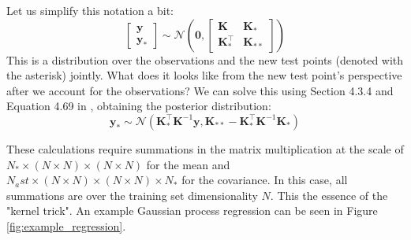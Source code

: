 \documentclass{article}
\begin{document}
Let us simplify this notation a bit:
\begin{equation}
    \begin{bmatrix}
    \mathbf{y} \\
    \mathbf{y_\ast}
    \end{bmatrix} \sim
    \mathcal{N}\left(\mathbf{0},
    \begin{bmatrix}
    \mathbf{K} & \mathbf{K}_\ast \\
    \mathbf{K}^\top_\ast & \mathbf{K}_{\ast\ast}
    \end{bmatrix}\right)
\end{equation} 
This is a distribution over the observations and the new test points (denoted with the asterisk) jointly. What does it looks like from the new test point's perspective after we account for the observations?  We can solve this using Section 4.3.4 and Equation 4.69 in \cite{murphy}, obtaining the posterior distribution:
\begin{equation}
\label{GP_posterior}
\mathbf{y}_\ast\sim\mathcal{N}\left(\mathbf{K}_\ast^\top \mathbf{K}^{-1}\mathbf{y},\mathbf{K}_{\ast\ast}-\mathbf{K}_\ast^\top \mathbf{K}^{-1}\mathbf{K}_\ast \right)
\end{equation}

These calculations require summations in the matrix multiplication at the scale of $N_\ast \times (N \times N) \times (N \times N)$ for the mean and $N_ast \times (N \times N) \times (N \times N) \times N_\ast$ for the covariance. In this case, all summations are over the training set dimensionality $N$. This the essence of the "kernel trick". An example Gaussian process regression can be seen in Figure \ref{fig:example_regression}.
\end{document}
